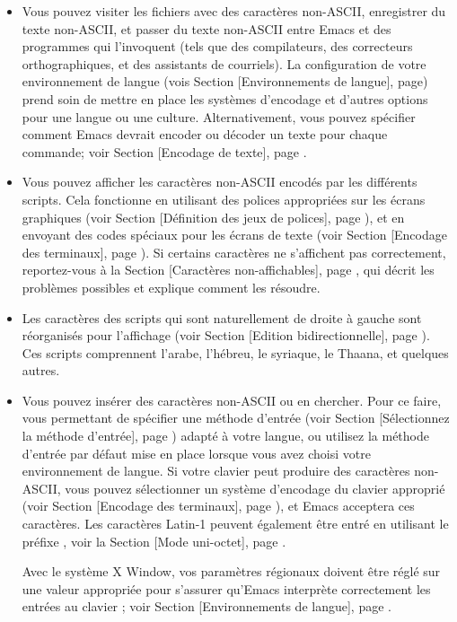 \begin{itemize}
\item Vous pouvez visiter les fichiers avec des caractères non-ASCII,
  enregistrer du texte non-ASCII, et passer du texte non-ASCII entre
  Emacs et des programmes qui l'invoquent (tels que des compilateurs,
  des correcteurs orthographiques, et des assistants de courriels). La
  configuration de votre environnement de langue (vois Section
   [Environnements de langue], page) prend
  soin de mettre en place les systèmes d'encodage et d'autres options
  pour une langue ou une culture. Alternativement, vous pouvez
  spécifier comment Emacs devrait encoder ou décoder un texte pour
  chaque commande; voir Section  [Encodage de texte],
  page .
\item Vous pouvez afficher les caractères non-ASCII encodés par les
  différents scripts. Cela fonctionne en utilisant des polices
  appropriées sur les écrans graphiques (voir Section 
  [Définition des jeux de polices], page ), et en
  envoyant des codes spéciaux pour les écrans de texte (voir Section
   [Encodage des terminaux], page ). Si
  certains caractères ne s'affichent pas correctement, reportez-vous à
  la Section  [Caractères non-affichables], page
  , qui décrit les problèmes possibles et explique
  comment les résoudre.
\item Les caractères des scripts qui sont naturellement de droite à
  gauche sont réorganisés pour l'affichage (voir Section
   [Edition bidirectionnelle], page
  ). Ces scripts comprennent l'arabe, l'hébreu, le
  syriaque, le Thaana, et quelques autres.
\item Vous pouvez insérer des caractères non-ASCII ou en
  chercher. Pour ce faire, vous permettant de spécifier une méthode
  d'entrée (voir Section  [Sélectionnez la méthode
  d'entrée], page ) adapté à votre langue, ou utilisez
  la méthode d'entrée par défaut mise en place lorsque vous avez
  choisi votre environnement de langue. Si votre clavier peut produire
  des caractères non-ASCII, vous pouvez sélectionner un système
  d'encodage du clavier approprié (voir Section 
  [Encodage des terminaux], page ), et Emacs acceptera
  ces caractères. Les caractères Latin-1 peuvent également être entré
  en utilisant le préfixe , voir la Section 
  [Mode uni-octet], page .

Avec le système X Window, vos paramètres régionaux doivent être réglé
sur une valeur appropriée pour s'assurer qu'Emacs interprète
correctement les entrées au clavier ; voir Section 
[Environnements de langue], page .
\end{itemize}

